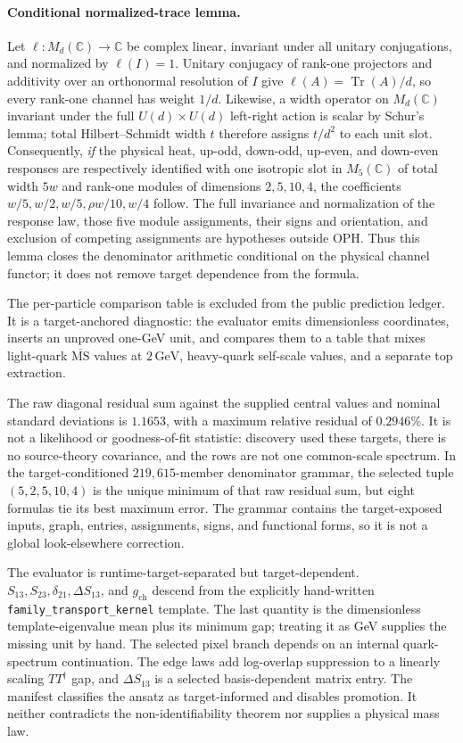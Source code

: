 \documentclass[11pt]{article}
\begin{document}
\paragraph{Conditional normalized-trace lemma.}
Let \(\ell:M_d(\mathbb C)\to\mathbb C\) be complex linear, invariant under all unitary
conjugations, and normalized by \(\ell(I)=1\).  Unitary conjugacy of rank-one projectors and
additivity over an orthonormal resolution of \(I\) give
\(\ell(A)=\operatorname{Tr}(A)/d\), so every rank-one channel has weight \(1/d\).
Likewise, a width operator on \(M_d(\mathbb C)\) invariant under the full
\(U(d)\times U(d)\) left-right action is scalar by Schur's lemma; total Hilbert--Schmidt width
\(t\) therefore assigns \(t/d^2\) to each unit slot.  Consequently, \emph{if} the physical heat,
up-odd, down-odd, up-even, and down-even responses are respectively identified with one isotropic
slot in \(M_5(\mathbb C)\) of total width \(5w\) and rank-one modules of dimensions
\(2,5,10,4\), the coefficients \(w/5,w/2,w/5,\rho w/10,w/4\) follow.
The full invariance and normalization of the response law, those five module assignments, their
signs and orientation, and exclusion of competing assignments are hypotheses outside OPH.
Thus this lemma closes the denominator arithmetic conditional on the physical channel
functor; it does not remove target dependence from the formula.

The per-particle comparison table is excluded from the public prediction ledger. It is a
target-anchored diagnostic: the evaluator emits dimensionless coordinates, inserts
an unproved one-GeV unit, and compares them to a table that mixes light-quark
\(\overline{\mathrm{MS}}\) values at \(2\,\mathrm{GeV}\), heavy-quark self-scale values, and a
separate top extraction.

The raw diagonal residual sum against the supplied central values and nominal standard deviations
is \(1.1653\), with a maximum relative residual of \(0.2946\%\).  It is not a likelihood or
goodness-of-fit statistic: discovery used these targets, there is no source-theory covariance, and
the rows are not one common-scale spectrum. In the target-conditioned \(219{,}615\)-member denominator
grammar, the selected tuple \((5,2,5,10,4)\) is the unique minimum of that raw residual sum, but
eight formulas tie its best maximum error. The grammar contains the target-exposed inputs, graph,
entries, assignments, signs, and functional forms, so it is not a global look-elsewhere correction.

The evaluator is runtime-target-separated but target-dependent.
\(S_{13},S_{23},\delta_{21},\Delta S_{13}\), and \(g_{\mathrm{ch}}\) descend from
the explicitly hand-written \texttt{family\_transport\_kernel} template.  The last quantity is the
dimensionless template-eigenvalue mean plus its minimum gap; treating it as GeV supplies the
missing unit by hand.  The selected pixel branch depends on an
internal quark-spectrum continuation.  The edge laws add log-overlap
suppression to a linearly scaling \(TT^\dagger\) gap, and \(\Delta S_{13}\) is a selected
basis-dependent matrix entry. The manifest classifies the ansatz as target-informed and disables promotion.
It neither contradicts the non-identifiability theorem nor supplies a physical mass law.
\end{document}

